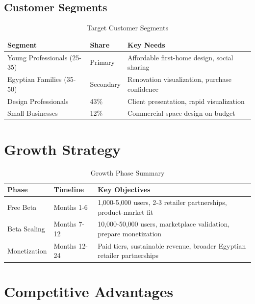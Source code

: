 \subsection{Customer Segments}

\begin{table}[h]
\centering
\caption{Target Customer Segments}
\begin{tabular}{p{3.5cm}p{3cm}p{5cm}}
\toprule
\textbf{Segment} & \textbf{Share} & \textbf{Key Needs} \\
\midrule
Young Professionals (25-35) & Primary & Affordable first-home design, social sharing \\
Egyptian Families (35-50) & Secondary & Renovation visualization, purchase confidence \\
Design Professionals & 43\% & Client presentation, rapid visualization \\
Small Businesses & 12\% & Commercial space design on budget \\
\bottomrule
\end{tabular}
\end{table}

\section{Growth Strategy}
\label{sec:app_growth}

\begin{table}[h]
\centering
\caption{Growth Phase Summary}
\begin{tabular}{p{3cm}p{3cm}p{6.5cm}}
\toprule
\textbf{Phase} & \textbf{Timeline} & \textbf{Key Objectives} \\
\midrule
Free Beta & Months 1-6 & 1,000-5,000 users, 2-3 retailer partnerships, product-market fit \\
Beta Scaling & Months 7-12 & 10,000-50,000 users, marketplace validation, prepare monetization \\
Monetization & Months 12-24 & Paid tiers, sustainable revenue, broader Egyptian retailer partnerships \\
\bottomrule
\end{tabular}
\end{table}

\section{Competitive Advantages}
\label{sec:app_competitive}

